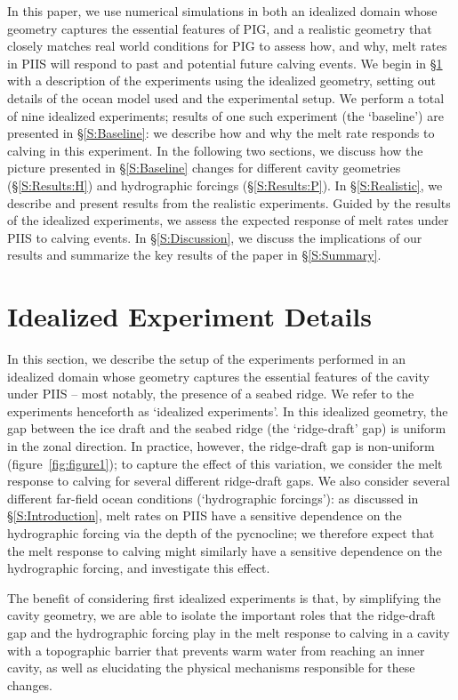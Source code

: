 \documentclass[draft]{agujournal2019}
\begin{document}
In this paper, we use numerical simulations in both an idealized domain whose geometry captures the essential features of PIG, and a realistic geometry that closely matches real world conditions for PIG to assess how, and why, melt rates in PIIS will respond to past and potential future calving events. We begin in \S\ref{S:Experiment} with a description of the experiments using the idealized geometry, setting out details of the ocean model used and the experimental setup. We perform a total of nine idealized experiments; results of one such experiment (the `baseline') are presented in \S\ref{S:Baseline}: we describe how and why the melt rate responds to calving in this experiment. In the following two sections, we discuss how the picture presented in \S\ref{S:Baseline} changes for different cavity geometries (\S\ref{S:Results:H}) and hydrographic forcings (\S\ref{S:Results:P}). In \S\ref{S:Realistic}, we describe and present results from the realistic experiments. Guided by the results of the idealized experiments, we assess the expected response of melt rates under PIIS to calving events. In \S\ref{S:Discussion}, we discuss the implications of our results and summarize the key results of the paper in \S\ref{S:Summary}.


\section{Idealized Experiment Details}\label{S:Experiment}
In this section, we describe the setup of the experiments performed in an idealized domain whose geometry captures the essential features of the cavity under PIIS -- most notably, the presence of a seabed ridge. We refer to the experiments henceforth as `idealized experiments'. In this idealized geometry, the gap between the ice draft and the seabed ridge (the `ridge-draft' gap) is uniform in the zonal direction. In practice, however, the ridge-draft gap is non-uniform (figure~\ref{fig:figure1}); to capture the effect of this variation, we consider the melt response to calving for several different ridge-draft gaps. We also consider several different far-field ocean conditions (`hydrographic forcings'): as discussed in \S\ref{S:Introduction}, melt rates on PIIS have a sensitive dependence on the hydrographic forcing via the depth of the pycnocline; we therefore expect that the melt response to calving might similarly have a sensitive dependence on the hydrographic forcing, and investigate this effect.

The benefit of considering first idealized experiments is that, by simplifying the cavity geometry, we are able to isolate the important roles that the ridge-draft gap and the hydrographic forcing play in the melt response to calving in a cavity with a topographic barrier that prevents warm water from reaching an inner cavity, as well as elucidating the physical mechanisms responsible for these changes. 
\end{document}
